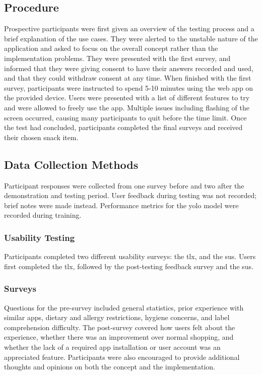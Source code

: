 \documentclass[thesis]{fputhesis}
\begin{document}
\begin{body}
\subsection{Procedure}
Prospective participants were first given an overview of the testing process and a brief explanation of the use cases. They were alerted to the unstable nature of the application and asked to focus on the overall concept rather than the implementation problems. They were presented with the first survey, and informed that they were giving consent to have their answers recorded and used, and that they could withdraw consent at any time. When finished with the first survey, participants were instructed to spend 5-10 minutes using the web app on the provided device. Users were presented with a list of different features to try and were allowed to freely use the app. Multiple issues including flashing of the screen occurred, causing many participants to quit before the time limit. Once the test had concluded, participants completed the final surveys and received their chosen snack item.
\subsection{Data Collection Methods}
Participant responses were collected from one survey before and two after the demonstration and testing period. User feedback during testing was not recorded; brief notes were made instead. Performance metrics for the \acrshort{yolo} model were recorded during training. 
\subsubsection{Usability Testing}
Participants completed two different usability surveys: the \acrfull{tlx}, and the \acrfull{sus}. Users first completed the \acrshort{tlx}, followed by the post-testing feedback survey and the \acrshort{sus}. 
\subsubsection{Surveys}
Questions for the pre-survey included general statistics, prior experience with similar apps, dietary and allergy restrictions, hygiene concerns, and label comprehension difficulty. The post-survey covered how users felt about the experience, whether there was an improvement over normal shopping, and whether the lack of a required app installation or user account was an appreciated feature. Participants were also encouraged to provide additional thoughts and opinions on both the concept and the implementation.


\end{body}
\end{document}
